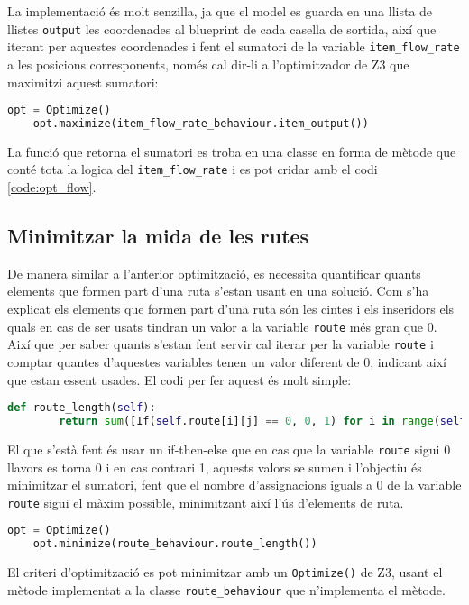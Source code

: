 La implementació és molt senzilla, ja que el model es guarda en una llista de llistes \lstinline{output} les coordenades al blueprint de cada casella de sortida, així que iterant per aquestes coordenades i fent el sumatori de la variable \lstinline{item_flow_rate} a les posicions corresponents, només cal dir-li a l'optimitzador de Z3 que maximitzi aquest sumatori:

\begin{lstlisting}[language=Python, caption=Maximitzar el criteri, label=code:opt_flow]
    opt = Optimize()
    opt.maximize(item_flow_rate_behaviour.item_output())
\end{lstlisting}
La funció que retorna el sumatori es troba en una classe en forma de mètode que conté tota la logica del \lstinline{item_flow_rate} i es pot cridar amb el codi \ref{code:opt_flow}.

\subsection{Minimitzar la mida de les rutes}
De manera similar a l'anterior optimització, es necessita quantificar quants elements que formen part d'una ruta s'estan usant en una solució. Com s'ha explicat els elements que formen part d'una ruta són les cintes i els inseridors els quals en cas de ser usats tindran un valor a la variable \lstinline{route} més gran que 0. Així que per saber quants s'estan fent servir cal iterar per la variable \lstinline{route} i comptar quantes d'aquestes variables tenen un valor diferent de 0, indicant així que estan essent usades. El codi per fer aquest és molt simple:
\begin{lstlisting}[language=Python, caption=Quantitat d'elements de ruta]
    def route_length(self):
        return sum([If(self.route[i][j] == 0, 0, 1) for i in range(self.height) for j in range(self.width)])
\end{lstlisting}
El que s'està fent és usar un if-then-else que en cas que la variable \lstinline{route} sigui 0 llavors es torna 0 i en cas contrari 1, aquests valors se sumen i l'objectiu és minimitzar el sumatori, fent que el nombre d'assignacions iguals a 0 de la variable \lstinline{route} sigui el màxim possible, minimitzant així l'ús d'elements de ruta.
\begin{lstlisting}[language=Python, caption=Minimitzar el criteri]
    opt = Optimize()
    opt.minimize(route_behaviour.route_length())
\end{lstlisting}
El criteri d'optimització es pot minimitzar amb un \lstinline{Optimize()} de Z3, usant el mètode implementat a la classe \lstinline{route_behaviour} que n'implementa el mètode.

